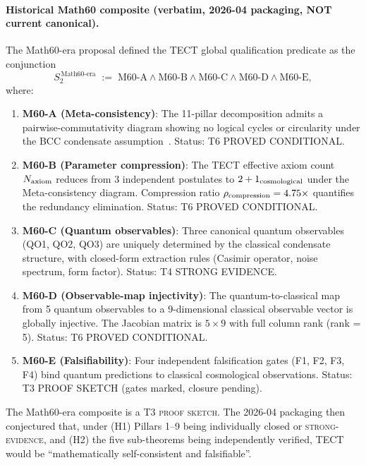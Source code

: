 \paragraph{Historical Math60 composite (verbatim, 2026-04 packaging,
NOT current canonical).}
The Math60-era proposal defined the TECT global qualification
predicate as the conjunction
\[
  S_2^{\,\text{Math60-era}} \;:=\; \mathrm{M60\text{-}A}
  \wedge \mathrm{M60\text{-}B} \wedge \mathrm{M60\text{-}C}
  \wedge \mathrm{M60\text{-}D} \wedge \mathrm{M60\text{-}E},
\]
where:
\begin{enumerate}
\item {\bf M60-A (Meta-consistency)}: The 11-pillar decomposition
  admits a pairwise-commutativity diagram showing no logical cycles or
  circularity under the BCC condensate assumption~\cite{Math60A}.
  Status: T6 PROVED CONDITIONAL.

\item {\bf M60-B (Parameter compression)}: The TECT effective axiom
  count $N_{\rm axiom}$ reduces from 3 independent postulates to
  $2 + 1_{\rm cosmological}$ under the Meta-consistency diagram.
  Compression ratio $\rho_{\rm compression} = 4.75 \times$ quantifies the
  redundancy elimination. Status: T6 PROVED CONDITIONAL.

\item {\bf M60-C (Quantum observables)}: Three canonical quantum
  observables (QO1, QO2, QO3) are uniquely determined by the classical
  condensate structure, with closed-form extraction rules
  (Casimir operator, noise spectrum, form factor). Status: T4 STRONG EVIDENCE.

\item {\bf M60-D (Observable-map injectivity)}: The quantum-to-classical
  map from 5 quantum observables to a 9-dimensional classical observable
  vector is globally injective. The Jacobian matrix is $5 \times 9$ with
  full column rank (rank = 5). Status: T6 PROVED CONDITIONAL.

\item {\bf M60-E (Falsifiability)}: Four independent falsification gates
  (F1, F2, F3, F4) bind quantum predictions to classical cosmological
  observations. Status: T3 PROOF SKETCH (gates marked, closure pending).
\end{enumerate}
The Math60-era composite is a T3 \textsc{proof sketch}. The
2026-04 packaging then conjectured that, under (H1) Pillars 1--9
being individually closed or \textsc{strong-evidence}, and
(H2) the five sub-theorems being independently verified, TECT would
be ``mathematically self-consistent and falsifiable''.

